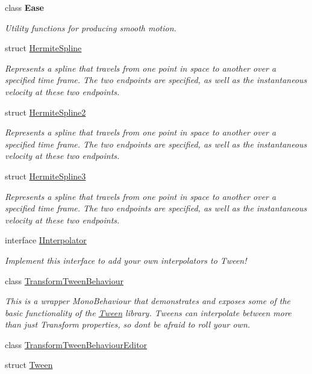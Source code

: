 \begin{DoxyCompactItemize}
\item 
class {\bfseries Ease}
\begin{DoxyCompactList}\small\item\em Utility functions for producing smooth motion. \end{DoxyCompactList}\item 
struct \mbox{\hyperlink{struct_leap_1_1_unity_1_1_animation_1_1_hermite_spline}{Hermite\+Spline}}
\begin{DoxyCompactList}\small\item\em Represents a spline that travels from one point in space to another over a specified time frame. The two endpoints are specified, as well as the instantaneous velocity at these two endpoints. \end{DoxyCompactList}\item 
struct \mbox{\hyperlink{struct_leap_1_1_unity_1_1_animation_1_1_hermite_spline2}{Hermite\+Spline2}}
\begin{DoxyCompactList}\small\item\em Represents a spline that travels from one point in space to another over a specified time frame. The two endpoints are specified, as well as the instantaneous velocity at these two endpoints. \end{DoxyCompactList}\item 
struct \mbox{\hyperlink{struct_leap_1_1_unity_1_1_animation_1_1_hermite_spline3}{Hermite\+Spline3}}
\begin{DoxyCompactList}\small\item\em Represents a spline that travels from one point in space to another over a specified time frame. The two endpoints are specified, as well as the instantaneous velocity at these two endpoints. \end{DoxyCompactList}\item 
interface \mbox{\hyperlink{interface_leap_1_1_unity_1_1_animation_1_1_i_interpolator}{I\+Interpolator}}
\begin{DoxyCompactList}\small\item\em Implement this interface to add your own interpolators to Tween! \end{DoxyCompactList}\item 
class \mbox{\hyperlink{class_leap_1_1_unity_1_1_animation_1_1_transform_tween_behaviour}{Transform\+Tween\+Behaviour}}
\begin{DoxyCompactList}\small\item\em This is a wrapper Mono\+Behaviour that demonstrates and exposes some of the basic functionality of the \mbox{\hyperlink{struct_leap_1_1_unity_1_1_animation_1_1_tween}{Tween}} library. Tweens can interpolate between more than just Transform properties, so don\textquotesingle{}t be afraid to roll your own. \end{DoxyCompactList}\item 
class \mbox{\hyperlink{class_leap_1_1_unity_1_1_animation_1_1_transform_tween_behaviour_editor}{Transform\+Tween\+Behaviour\+Editor}}
\item 
struct \mbox{\hyperlink{struct_leap_1_1_unity_1_1_animation_1_1_tween}{Tween}}
\end{DoxyCompactItemize}
